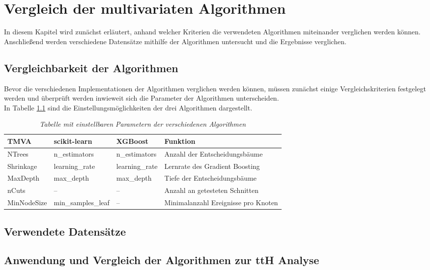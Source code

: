 \chapter{Vergleich der multivariaten Algorithmen}
\label{ch:vergleich}

{}	%

In diesem Kapitel wird zun\"achst erl\"autert, anhand welcher Kriterien die verwendeten Algorithmen miteinander verglichen werden k\"onnen. Anschlie\ss end werden verschiedene Datens\"atze mithilfe der Algorithmen untersucht und die Ergebnisse verglichen.

\section{Vergleichbarkeit der Algorithmen}
\label{ch:Vergleich:sec:Vergleichbarkeit}

Bevor die verschiedenen Implementationen der Algorithmen verglichen werden k\"onnen, m\"ussen zun\"achst einige Vergleichskriterien festgelegt werden und \"uberpr\"uft werden inwieweit sich die Parameter der Algorithmen unterscheiden.\\
In Tabelle \ref{tab:parameter} sind die Einstellungsm\"oglichkeiten der drei Algorithmen dargestellt.

\begin{table}[hhh]\parbox{12cm}{
  \caption[Algorithmenparameter]{\it Tabelle mit einstellbaren Parametern der verschiedenen Algorithmen}%
  }\label{tab:parameter}
  \begin{center}
  \begin{tabular}{llll}
  \hline
  {\bf TMVA} & {\bf scikit-learn} & {\bf XGBoost} & {\bf Funktion} \\
  \hline \hline
     NTrees	& n\_estimators & n\_estimators & Anzahl der Entscheidungsb\"aume \\
     Shrinkage	& learning\_rate & learning\_rate & Lernrate des Gradient Boosting \\
     MaxDepth & max\_depth & max\_depth & Tiefe der Entscheidungsb\"aume\\
     nCuts & -- & -- & Anzahl an getesteten Schnitten\\ 
  	 MinNodeSize & min_samples_leaf & -- & Minimalanzahl Ereignisse pro Knoten\\                             
  \hline
  \end{tabular}
  \end{center}
\end{table}


\section{Verwendete Datens\"atze}
\label{ch:Vergleich:sec:Daten}

\section{Anwendung und Vergleich der Algorithmen zur ttH Analyse}
\label{ch:Vergleich:sec:ttH}
